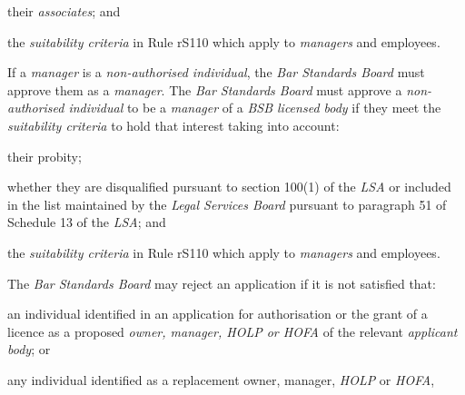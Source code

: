 \item their \emph{associates}; and

\item the \emph{suitability criteria} in Rule rS110 which apply to
\emph{managers} and employees.\la
\ln
{}

If a \emph{manager} is a \emph{non-authorised individual}, the \emph{Bar
Standards Board} must approve them as a \emph{manager}. The \emph{Bar
Standards Board} must approve a \emph{non-authorised individual} to be a
\emph{manager} of a \emph{BSB licensed body} if they meet the
\emph{suitability criteria} to hold that interest taking into account:\nl\item their probity;
\item whether they are disqualified pursuant to section 100(1) of the
\emph{LSA} or included in the list maintained by the \emph{Legal
Services Board} pursuant to paragraph 51 of Schedule 13 of the
\emph{LSA}; and
\item the \emph{suitability criteria} in Rule rS110 which apply to
\emph{managers} and employees.
\ln
{}

The \emph{Bar Standards Board} may reject an application if it is not
satisfied that:\nl\item an individual identified in an application for authorisation or the
grant of a licence as a proposed \emph{owner, manager, HOLP or HOFA} of
the relevant \emph{applicant body}; or
\item any individual identified as a replacement owner, manager,
\emph{HOLP} or \emph{HOFA},

